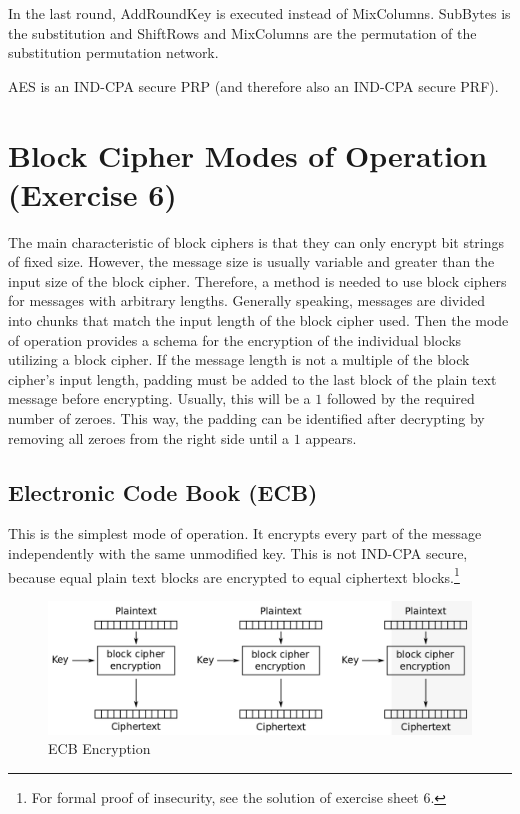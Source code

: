 In the last round, AddRoundKey is executed instead of MixColumns. SubBytes is the substitution and ShiftRows and MixColumns are the permutation of the substitution permutation network.

AES is an IND-CPA secure PRP (and therefore also an IND-CPA secure PRF).

\section{Block Cipher Modes of Operation (Exercise 6)}

The main characteristic of block ciphers is that they can only encrypt bit strings of fixed size.
However, the message size is usually variable and greater than the input size of the block cipher.
Therefore, a method is needed to use block ciphers for messages with arbitrary lengths.
Generally speaking, messages are divided into chunks that match the input length of the block cipher used.
Then the mode of operation provides a schema for the encryption of the individual blocks utilizing a block cipher.
If the message length is not a multiple of the block cipher's input length, padding must be added to the last block of the plain text message before encrypting. Usually, this will be a $1$ followed by the required number of zeroes. This way, the padding can be identified after decrypting by removing all zeroes from the right side until a $1$ appears.


\subsection{Electronic Code Book (ECB)}

This is the simplest mode of operation. It encrypts every part of the message independently with the same unmodified key. This is not IND-CPA secure, because equal plain text blocks are encrypted to equal ciphertext blocks.\footnote{For formal proof of insecurity, see the solution of exercise sheet 6.}

\begin{figure}
    \center
    \includegraphics[width=\linewidth]{gfx/ecb_enc_scheme.png}
    \caption{ECB Encryption}
    \label{fig:ecb_enc}
\end{figure}

